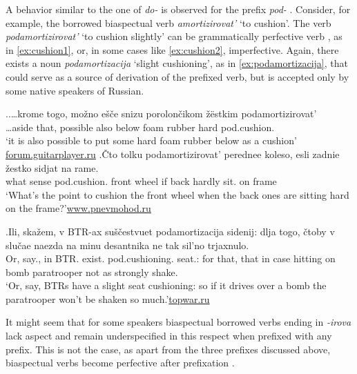 A behavior similar to the one of \textit{do-}   is observed for the prefix \textit{pod-}    . Consider, for example, the borrowed biaspectual verb    \textit{amortizirovat'} `to cushion'. The verb \textit{podamortizirovat'} `to cushion slightly' can be grammatically perfective verb , as in \ref{ex:cushion1}, or, in some cases like \ref{ex:cushion2}, imperfective. Again, there exists a noun \textit{podamortizacija} `slight cushioning', as in \ref{ex:podamortizacija}, that could serve as a source of derivation of the prefixed verb, but is accepted only by some native speakers of Russian.

\ex.\label{ex:cushion}\ag.\label{ex:cushion1}…krome togo, mo\v{z}no e\v{s}\v{c}e snizu porolon\v{c}ikom \v{z}\"{e}stkim podamortizirovat'\textsuperscript{\PF}\\		
…aside that, possible also below {foam rubber} hard pod.cushion.\\
\trans `it is also possible to put some hard foam rubber below as a cushion'\\\hbox{}\hfill\hbox{\url{forum.guitarplayer.ru}}
\bg.\label{ex:cushion2}\v{C}to tolku podamortizirovat'\textsuperscript{\IPF} perednee koleso, esli zadnie \v{z}estko sidjat na rame.\\
what sense pod.cushion. front wheel if back hardly sit. on frame\\
\trans `What's the point to cushion the front wheel when the back ones are sitting hard on the frame?'\hbox{}\hfill\hbox{\url{www.pnevmohod.ru}}

\exg.\label{ex:podamortizacija}Ili, ska\v{z}em, v BTR-ax su\v{s}\v{c}estvuet podamortizacija sidenij: dlja togo, \v{c}toby v slu\v{c}ae naezda na minu desantnika ne tak sil'no trjaxnulo.\\
Or, say., in BTR. exist. pod.cushioning. seat.: for that, that in case hitting on bomb paratrooper not as strongly shake.\\
\trans `Or, say, BTRs have a slight seat cushioning: so if it drives over a bomb the paratrooper won't be shaken so much.'\hbox{}\hfill\hbox{\url{topwar.ru}}

It might seem that for some speakers biaspectual borrowed verbs ending in \mbox{\textit{-irova}} lack aspect and remain underspecified in this respect when prefixed with any prefix. This is not the case, as apart from the three prefixes discussed above, biaspectual verbs  become perfective after prefixation . 

